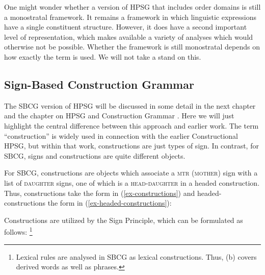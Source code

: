 \documentclass[output=paper
	        ,collection
	        ,collectionchapter
 	        ,biblatex
                ,babelshorthands
                ,newtxmath
                ,draftmode
                ,colorlinks, citecolor=brown
]{langscibook}
\begin{document}
One might wonder whether a version of HPSG that includes order domains is still a monostratal framework. It remains a framework in which linguistic expressions have a single constituent structure. However, it does have a second important level of representation, which makes available a variety of analyses which would otherwise not be possible. Whether the framework is still monostratal depends on how exactly the term is used. We will not take a stand on this.

\subsection{Sign-Based Construction Grammar}\label{sec:prop7.2}
\label{prop:sec-sbcg}

The SBCG version of HPSG will be discussed in some detail in the next chapter  and the chapter on HPSG and Construction Grammar . Here we will just highlight the central difference between this approach and earlier work. The term ``construction'' is widely used in connection with the earlier Constructional HPSG, but within that work, constructions are just types of sign. In contrast, for SBCG, signs and constructions are quite different objects.

For SBCG, constructions are objects which associate a \textsc{mtr} (\textsc{mother}) sign with a list of \textsc{daughter} signs, one of which is a \textsc{head-daughter} in a headed construction. Thus, constructions take the form in (\ref{ex-constructions}) and headed-constructions the form in (\ref{ex-headed-constructions}):

\eal\label{ex:prop48}
\ex\label{ex:prop48a}\label{ex-constructions}
	
	
\ex\label{ex:prop48b}\label{ex-headed-constructions}
\zl

\noindent
Constructions are utilized by the Sign Principle, which can be formulated as follows:%
%
\footnote{Lexical rules are analysed in SBCG as lexical constructions. Thus, (b) covers derived words as well as phrases.}
%
\end{document}
